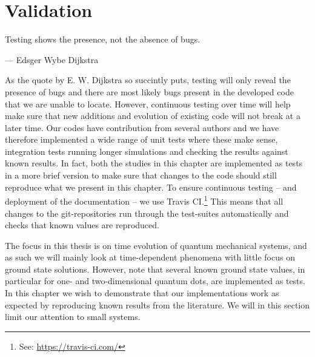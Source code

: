 \chapter{Validation}
    \label{chap:validation}
    \epigraph{Testing shows the presence, not the absence of bugs.}
    {--- Edsger Wybe Dijkstra}

    As the quote by E. W. Dijkstra so succintly puts, testing will only reveal
    the presence of bugs and there are most likely bugs present in the developed
    code that we are unable to locate.
    However, continuous testing over time will help make sure that new additions
    and evolution of existing code will not break at a later time.
    Our codes have contribution from several authors and we have therefore
    implemented a wide range of unit tests where these make sense, integration
    tests running longer simulations and checking the results against known
    results.
    In fact, both the studies in this chapter are implemented as tests in a more
    brief version to make sure that changes to the code should still reproduce
    what we present in this chapter.
    To ensure continuous testing -- and deployment of the documentation --
    we use Travis CI.\footnote{%
        See: \url{https://travis-ci.com/}
    }
    This means that all changes to the git-repositories run through the
    test-suites automatically and checks that known values are reproduced.

    The focus in this thesis is on time evolution of quantum mechanical systems,
    and as such we will mainly look at time-dependent phenomena with little
    focus on ground state solutions.
    However, note that several known ground state values, in particular for one-
    and two-dimensional quantum dots, are implemented as tests.
    In this chapter we wish to demonstrate that our implementations work as
    expected by reproducing known results from the literature.
    We will in this section limit our attention to small systems.

